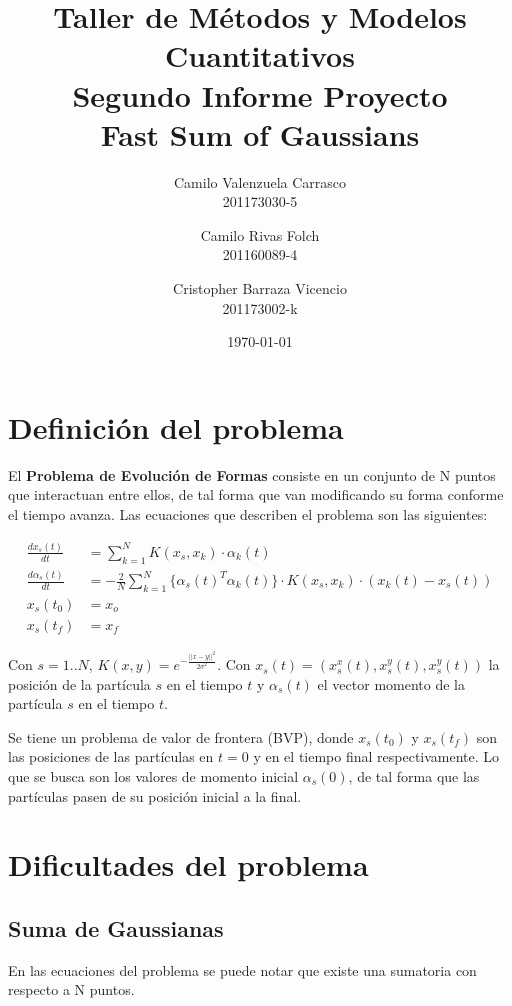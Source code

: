 \documentclass[letter, 10pt]{article}
\begin{document}
\title{ Taller de Métodos y Modelos Cuantitativos \\ Segundo Informe Proyecto \\ Fast Sum of Gaussians  }
\author{Camilo Valenzuela Carrasco\\ 201173030-5
\and
Camilo Rivas Folch \\ 201160089-4
\and
Cristopher Barraza Vicencio \\201173002-k}
\date{\today}
\maketitle

\section{Definición del problema}

El \textbf{Problema de Evolución de Formas} consiste en un conjunto de N puntos que interactuan entre ellos, de tal forma que van modificando su forma conforme el tiempo avanza. Las ecuaciones que describen el problema son las siguientes:

\begin{align}
    \frac{dx_s(t)}{dt} &= \sum_{k=1}^N K(x_s, x_k)\cdot \alpha_k(t) \label{edo}\\
    \frac{d\alpha_s(t)}{dt} &= -\frac{2}{N} \sum_{k=1}^N \{\alpha_s(t)^T \alpha_k(t) \} \cdot K(x_s, x_k) \cdot (x_k(t) - x_s(t)) \\
    x_s(t_0) &= x_o \\
    x_s(t_f) &= x_f
\end{align}

Con $s = 1..N$, $K(x, y) = e^{-\frac{|| x - y ||^2}{2\sigma^2}}$. Con $x_s(t) = (x_s^x(t), x_s^y(t), x_s^y(t))$ la posición de la partícula $s$ en el tiempo $t$ y $\alpha_s(t)$ el vector momento de la partícula $s$ en el tiempo $t$.

Se tiene un problema de valor de frontera (BVP), donde $x_s(t_0)$ y $x_s(t_f)$ son las posiciones de las partículas en $t = 0$ y en el tiempo final respectivamente. Lo que se busca son los valores de momento inicial $\alpha_s(0)$, de tal forma que las partículas pasen de su posición inicial a la final.


\newpage
\section{Dificultades del problema}

\subsection{Suma de Gaussianas}
En las ecuaciones del problema se puede notar que existe una sumatoria con respecto a N puntos.
\end{document}
